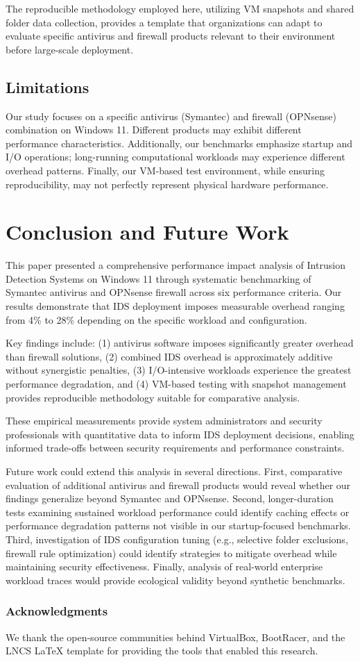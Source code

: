 \documentclass[runningheads,a4paper,english]{llncs}[2022/01/12]
\begin{document}
The reproducible methodology employed here, utilizing VM snapshots and shared folder data collection, provides a template that organizations can adapt to evaluate specific antivirus and firewall products relevant to their environment before large-scale deployment.

\subsection{Limitations}

Our study focuses on a specific antivirus (Symantec) and firewall (OPNsense) combination on Windows 11. Different products may exhibit different performance characteristics. Additionally, our benchmarks emphasize startup and I/O operations; long-running computational workloads may experience different overhead patterns. Finally, our VM-based test environment, while ensuring reproducibility, may not perfectly represent physical hardware performance.

\section{Conclusion and Future Work}
\label{sec:conclusion}

This paper presented a comprehensive performance impact analysis of Intrusion Detection Systems on Windows 11 through systematic benchmarking of Symantec antivirus and OPNsense firewall across six performance criteria. Our results demonstrate that IDS deployment imposes measurable overhead ranging from 4\% to 28\% depending on the specific workload and configuration.

Key findings include: (1) antivirus software imposes significantly greater overhead than firewall solutions, (2) combined IDS overhead is approximately additive without synergistic penalties, (3) I/O-intensive workloads experience the greatest performance degradation, and (4) VM-based testing with snapshot management provides reproducible methodology suitable for comparative analysis.

These empirical measurements provide system administrators and security professionals with quantitative data to inform IDS deployment decisions, enabling informed trade-offs between security requirements and performance constraints.

Future work could extend this analysis in several directions. First, comparative evaluation of additional antivirus and firewall products would reveal whether our findings generalize beyond Symantec and OPNsense. Second, longer-duration tests examining sustained workload performance could identify caching effects or performance degradation patterns not visible in our startup-focused benchmarks. Third, investigation of IDS configuration tuning (e.g., selective folder exclusions, firewall rule optimization) could identify strategies to mitigate overhead while maintaining security effectiveness. Finally, analysis of real-world enterprise workload traces would provide ecological validity beyond synthetic benchmarks.

\subsubsection*{Acknowledgments}

We thank the open-source communities behind VirtualBox, BootRacer, and the LNCS LaTeX template for providing the tools that enabled this research.



\end{document}
